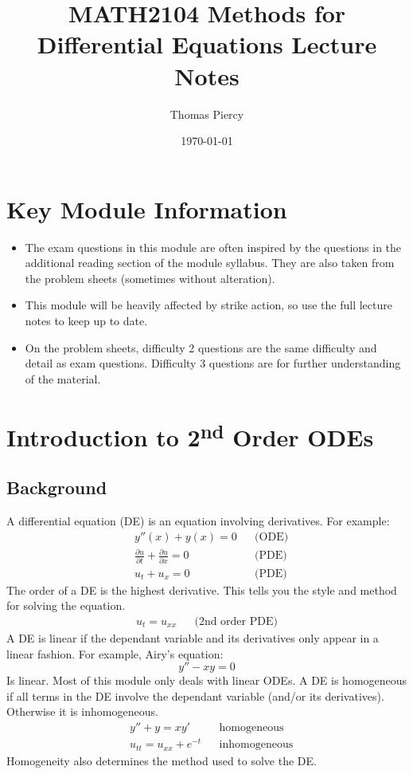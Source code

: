 \documentclass[12pt]{article}
\title{\textbf{MATH2104 Methods for Differential Equations Lecture Notes}}
\author{Thomas Piercy}
\date{\today{}}
\newcommand{\pf}[2]{\frac{\partial #1}{\partial #2}}
\begin{document}
\maketitle
\hrulefill
\tableofcontents
\newpage
{}
\section{Key Module Information}
\begin{itemize}
    \item The exam questions in this module are often inspired by the questions in the additional reading section of the module syllabus. They are also taken from the problem sheets (sometimes without alteration).
    \item This module will be heavily affected by strike action, so use the full lecture notes to keep up to date.
    \item On the problem sheets, difficulty 2 questions are the same difficulty and detail as exam questions. Difficulty 3 questions are for further understanding of the material.
\end{itemize}
\section{Introduction to 2\textsuperscript{nd} Order ODEs}
\subsection{Background}
A differential equation (DE) is an equation involving derivatives. For example:
\begin{align*}
    &y''(x)+y(x)=0 && \text{(ODE)}\\
    &\pf{u}{t}+\pf{u}{x}=0 && \text{(PDE)} \\
    &u_t+u_x=0 && \text{(PDE)}
\end{align*}
The order of a DE is the highest derivative. This tells you the style and method for solving the equation.
\begin{align*}
    u_t=u_{xx} && \text{(2nd order PDE)}
\end{align*}
A DE is linear if the dependant variable and its derivatives only appear in a linear fashion. For example, Airy's equation:
\[y''-xy=0\]
Is linear. Most of this module only deals with linear ODEs. A DE is homogeneous if all terms in the DE involve the dependant variable (and/or its derivatives). Otherwise it is inhomogeneous.
\begin{align*}
    &y''+y=xy' && \text{homogeneous} \\
    &u_{tt}=u_{xx}+e^{-t} && \text{inhomogeneous}
\end{align*}
Homogeneity also determines the method used to solve the DE.
\end{document}

